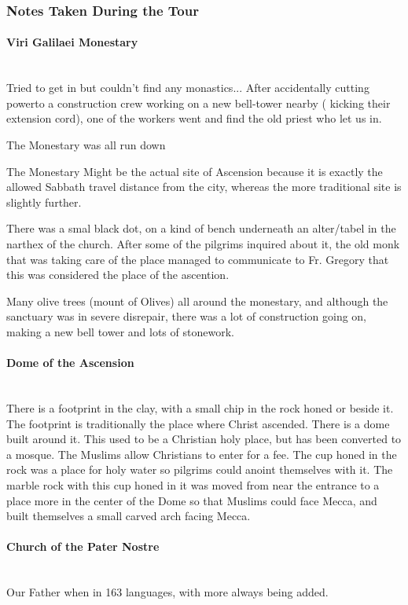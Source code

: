 \documentclass[letterpaper]{report}
\begin{document}
\subsubsection{Notes Taken During the Tour}
\begin{multicols}{2}
\paragraph{Viri Galilaei Monestary}\mbox{}\\
Tried to get in but couldn't find any monastics... After accidentally cutting powerto
a construction crew working on a new bell-tower nearby ( kicking their extension cord),
one of the workers went and find the old priest who let us in.

The Monestary was all run down

The Monestary Might be the actual site of Ascension because it is exactly the allowed Sabbath travel distance from the city, whereas the more traditional site is slightly further.

There was a smal black dot, on a kind of bench underneath an alter/tabel in the narthex of the church.
After some of the pilgrims inquired about it,
the old monk that was taking care of the place managed to communicate to Fr. Gregory that this was considered the place
of the ascention.

Many olive trees (mount of Olives) all around the monestary,
and although the sanctuary was in severe
disrepair,
there was a lot of construction going on,
making a new bell tower and lots of stonework.


\paragraph{Dome of the Ascension}\mbox{}\\
There is a footprint in the clay, with a small chip in the rock honed or beside it.
The footprint is traditionally the place where Christ ascended. There is a dome built around it. This used to be a Christian holy place, but has been converted to a mosque. The Muslims allow Christians to enter for a fee.
The cup honed in the rock was a place for holy water so pilgrims could anoint themselves with it. The marble rock with this cup honed in it was moved from near the entrance to a place more in the center of the Dome so that Muslims could face Mecca, and built themselves a small carved arch facing Mecca.

\paragraph{Church of the Pater Nostre}\mbox{}\\
Our Father when in 163 languages, with more always being added.


\end{multicols}
\end{document}
